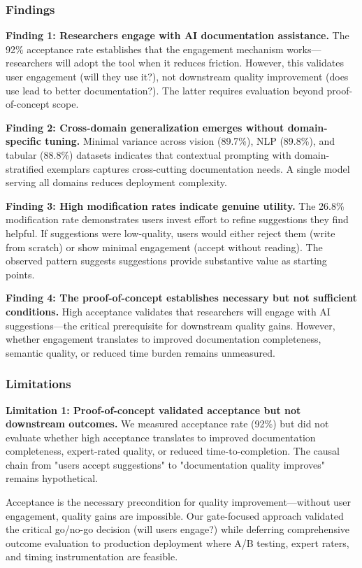 
\subsubsection{Findings}

\textbf{Finding 1: Researchers engage with AI documentation assistance.} The 92\% acceptance rate establishes that the engagement mechanism works—researchers will adopt the tool when it reduces friction. However, this validates user engagement (will they use it?), not downstream quality improvement (does use lead to better documentation?). The latter requires evaluation beyond proof-of-concept scope.

\textbf{Finding 2: Cross-domain generalization emerges without domain-specific tuning.} Minimal variance across vision (89.7\%), NLP (89.8\%), and tabular (88.8\%) datasets indicates that contextual prompting with domain-stratified exemplars captures cross-cutting documentation needs. A single model serving all domains reduces deployment complexity.

\textbf{Finding 3: High modification rates indicate genuine utility.} The 26.8\% modification rate demonstrates users invest effort to refine suggestions they find helpful. If suggestions were low-quality, users would either reject them (write from scratch) or show minimal engagement (accept without reading). The observed pattern suggests suggestions provide substantive value as starting points.

\textbf{Finding 4: The proof-of-concept establishes necessary but not sufficient conditions.} High acceptance validates that researchers will engage with AI suggestions—the critical prerequisite for downstream quality gains. However, whether engagement translates to improved documentation completeness, semantic quality, or reduced time burden remains unmeasured.

\subsubsection{Limitations}

\textbf{Limitation 1: Proof-of-concept validated acceptance but not downstream outcomes.} We measured acceptance rate (92\%) but did not evaluate whether high acceptance translates to improved documentation completeness, expert-rated quality, or reduced time-to-completion. The causal chain from "users accept suggestions" to "documentation quality improves" remains hypothetical.

Acceptance is the necessary precondition for quality improvement—without user engagement, quality gains are impossible. Our gate-focused approach validated the critical go/no-go decision (will users engage?) while deferring comprehensive outcome evaluation to production deployment where A/B testing, expert raters, and timing instrumentation are feasible.

